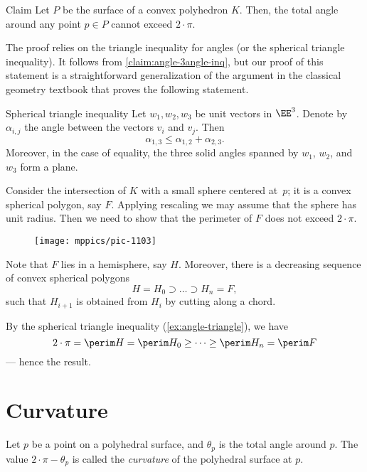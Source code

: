 \begin{thm}{Claim}\label{clm:total-angle}
Let $P$ be the surface of a convex polyhedron $K$.
Then, the total angle around any point $p\in P$ cannot exceed $2\cdot\pi$.
\end{thm}

The proof relies on the triangle inequality for angles (or the spherical triangle inequality).
It follows from \ref{claim:angle-3angle-inq}, but our proof of this statement is a straightforward generalization of the argument in the classical geometry textbook \cite[§ 47]{kiselev-stereo-en} that proves the following statement.

\begin{thm}{Spherical triangle inequality}\label{ex:angle-triangle}
Let $w_1,w_2,w_3$ be unit vectors in $\EE^3$.
Denote by $\alpha_{i,j}$ the angle between the vectors $v_i$ and $v_j$.
Then
$$\alpha_{1,3}\le \alpha_{1,2}+\alpha_{2,3}.$$
Moreover, in the case of equality, the three solid angles spanned by $w_1$, $w_2$, and $w_3$ form a plane.
\end{thm}

Consider the intersection of $K$ with a small sphere centered at~$p$;
it is a convex spherical polygon, say $F$.
Applying rescaling we may assume that the sphere has unit radius.
Then we need to show that the perimeter of $F$ does not exceed $2\cdot\pi$.

\begin{wrapfigure}{o}{22mm}
\vskip-4mm
\centering
\texttt{[image: mppics/pic-1103]}
\end{wrapfigure}

Note that $F$ lies in a hemisphere, say $H$.
Moreover, there is a decreasing sequence of convex spherical polygons
\[H=H_0\supset\dots\supset H_n=F,\]
such that $H_{i+1}$ is obtained from $H_{i}$ by cutting along a chord.

By the spherical triangle inequality (\ref{ex:angle-triangle}), we have
\[
2\cdot\pi=\perim H=\perim H_0\ge\dots\ge\perim H_n=\perim F
\]
--- hence the result.
\qeds

\section{Curvature}

Let $p$ be a point on a polyhedral surface, and $\theta_p$ is the total angle around $p$.
The value $2\cdot \pi -\theta_p$ is called the \emph{curvature} of the polyhedral surface at $p$.

